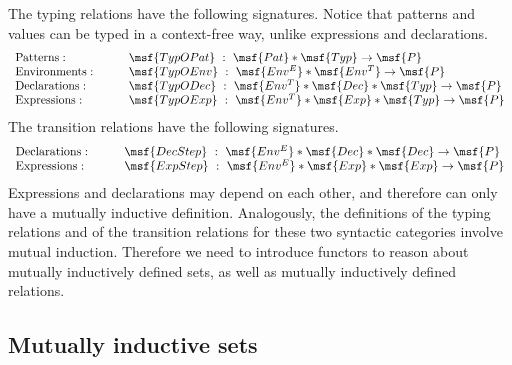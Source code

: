 \documentclass[submission,copyright,creativecommons]{eptcs}
\begin{document}
The typing relations have the following signatures. Notice that
patterns and values can be typed in a context-free way, unlike
expressions and declarations.
\begin{gather} 
\begin{array}{llll}
\mbox{Patterns}: \qquad & \msf{TypOPat} \ : \ \msf{Pat} * \msf{Typ}
\to \msf{P} \\
\mbox{Environments}: \qquad & \msf{TypOEnv} \ : \ \msf{Env^E} *
\msf{Env^T} \to \msf{P} \\
\mbox{Declarations}: \qquad & \msf{TypODec} \ : \ \msf{Env^T} *
\msf{Dec} * \msf{Typ} \to \msf{P} \\
\mbox{Expressions}: \qquad & \msf{TypOExp} \ : \ \msf{Env^T} *
\msf{Exp} * \msf{Typ} \to \msf{P}
\end{array}
 \end{gather} 
The transition relations have the following signatures.
\begin{gather} 
\begin{array}{llll}
\mbox{Declarations}: \qquad & \msf{DecStep} \ : \ 
\msf{Env^E} * \msf{Dec} * \msf{Dec}  \to \msf{P} \\
\mbox{Expressions}: \qquad & \msf{ExpStep} \ : \ 
\msf{Env^E} * \msf{Exp} * \msf{Exp} \to \msf{P}
\end{array}
 \end{gather} 
Expressions and declarations may depend on each other, and therefore
can only have a mutually inductive definition. Analogously, the
definitions of the typing relations and of the transition relations
for these two syntactic categories involve mutual induction. Therefore
we need to introduce functors to reason about mutually inductively
defined sets, as well as mutually inductively defined relations. 


\subsection{Mutually inductive sets}
\end{document}
